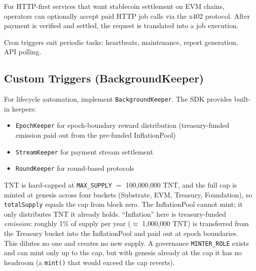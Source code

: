\documentclass[11pt,a4paper]{article}
\begin{document}
For HTTP-first services that want stablecoin settlement on EVM chains, operators can optionally accept paid HTTP job
calls via the x402 protocol. After payment is verified and settled, the request is translated into a job execution.

Cron triggers suit periodic tasks: heartbeats, maintenance, report generation, API polling.

\subsection{Custom Triggers (BackgroundKeeper)}

For lifecycle automation, implement \texttt{BackgroundKeeper}. The SDK provides built-in keepers:

\begin{itemize}[noitemsep]
    \item \texttt{EpochKeeper} for epoch-boundary reward distribution (treasury-funded emission paid out from the pre-funded InflationPool)
    \item \texttt{StreamKeeper} for payment stream settlement
    \item \texttt{RoundKeeper} for round-based protocols
\end{itemize}

TNT is hard-capped at \texttt{MAX\_SUPPLY} $=$ 100{,}000{,}000 TNT,
and the full cap is minted at genesis across four buckets (Substrate, EVM, Treasury, Foundation), so \texttt{totalSupply} equals the cap from block zero. The InflationPool cannot mint; it only distributes TNT it already holds. ``Inflation'' here is treasury-funded \emph{emission}: roughly 1\% of supply per year ($\approx$ 1{,}000{,}000 TNT)
is transferred from the Treasury bucket into the InflationPool and paid out at epoch boundaries. This dilutes no one and creates no new supply. A governance \texttt{MINTER\_ROLE} exists and can mint only up to the cap, but with genesis already at the cap it has no headroom (a \texttt{mint()} that would exceed the cap reverts).
\end{document}
